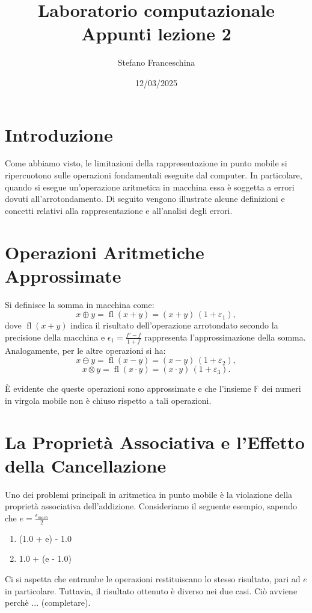 \documentclass[letterpaper,12pt]{article}
\title{Laboratorio computazionale \\[1ex] \large Appunti lezione 2}
\author{Stefano Franceschina}
\date{12/03/2025}
\newcommand{\numberset}{\mathbb}
\newcommand{\F}{\numberset{F}}
\begin{document}
\maketitle

\section*{Introduzione}

Come abbiamo visto, le limitazioni della rappresentazione in punto mobile si ripercuotono sulle operazioni fondamentali 
eseguite dal computer. In particolare, quando si esegue un'operazione aritmetica in macchina essa è soggetta a errori 
dovuti all'arrotondamento. Di seguito vengono illustrate alcune definizioni e concetti relativi alla rappresentazione e 
all'analisi degli errori.

\section*{Operazioni Aritmetiche Approssimate}

Si definisce la somma in macchina come:
\[
x \oplus y = \operatorname{fl}(x+y) = (x+y)\,(1+\varepsilon_1),
\]
dove $\operatorname{fl}(x+y)$ indica il risultato dell'operazione arrotondato secondo la precisione della macchina 
e $\epsilon_1 = \frac{f'-f}{1+f}$ rappresenta l'approssimazione della somma. Analogamente, per le altre operazioni si ha:
\[
x \ominus y = \operatorname{fl}(x-y) = (x-y)\,(1+\varepsilon_2),
\]
\[
x \otimes y = \operatorname{fl}(x\cdot y) = (x\cdot y)\,(1+\varepsilon_3).
\]

È evidente che queste operazioni sono approssimate e che l'insieme $\F$ dei numeri in virgola mobile non è chiuso rispetto 
a tali operazioni.

\section*{La Proprietà Associativa e l'Effetto della Cancellazione}

Uno dei problemi principali in aritmetica in punto mobile è la violazione della proprietà associativa dell'addizione. 
Consideriamo il seguente esempio, sapendo che $e = \frac{\epsilon_{mach}}{2}$
\begin{enumerate}
    \item (1.0 + e) - 1.0
    \item 1.0 + (e - 1.0)
\end{enumerate}
Ci si aspetta che entrambe le operazioni restituiscano lo stesso risultato, pari ad $e$ in particolare. Tuttavia, il 
risultato ottenuto è diverso nei due casi. Ciò avviene perchè ... (completare).
\end{document}
